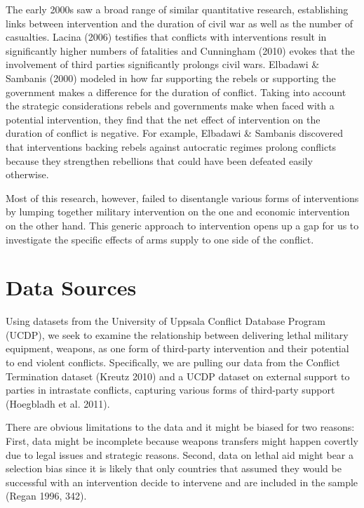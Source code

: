 \documentclass[]{article}
\begin{document}
The early 2000s saw a broad range of similar quantitative research,
establishing links between intervention and the duration of civil war as
well as the number of casualties. Lacina (2006) testifies that conflicts
with interventions result in significantly higher numbers of fatalities
and Cunningham (2010) evokes that the involvement of third parties
significantly prolongs civil wars. Elbadawi \& Sambanis (2000) modeled
in how far supporting the rebels or supporting the government makes a
difference for the duration of conflict. Taking into account the
strategic considerations rebels and governments make when faced with a
potential intervention, they find that the net effect of intervention on
the duration of conflict is negative. For example, Elbadawi \& Sambanis
discovered that interventions backing rebels against autocratic regimes
prolong conflicts because they strengthen rebellions that could have
been defeated easily otherwise.

Most of this research, however, failed to disentangle various forms of
interventions by lumping together military intervention on the one and
economic intervention on the other hand. This generic approach to
intervention opens up a gap for us to investigate the specific effects
of arms supply to one side of the conflict.

\section{Data Sources}\label{data-sources}

Using datasets from the University of Uppsala Conflict Database Program
(UCDP), we seek to examine the relationship between delivering lethal
military equipment, weapons, as one form of third-party intervention and
their potential to end violent conflicts. Specifically, we are pulling
our data from the Conflict Termination dataset (Kreutz 2010) and a UCDP
dataset on external support to parties in intrastate conflicts,
capturing various forms of third-party support (Hoegbladh et al. 2011).

There are obvious limitations to the data and it might be biased for two
reasons: First, data might be incomplete because weapons transfers might
happen covertly due to legal issues and strategic reasons. Second, data
on lethal aid might bear a selection bias since it is likely that only
countries that assumed they would be successful with an intervention
decide to intervene and are included in the sample (Regan 1996, 342).
\end{document}
